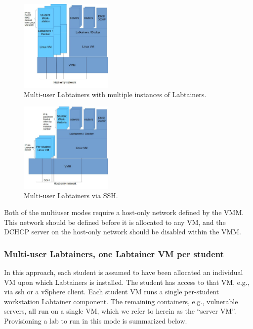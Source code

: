 \documentclass[12pt]{article}
\begin{document}
\begin{figure}[ht]
\centering
\includegraphics[width=0.4\textwidth,natwidth=621,natheight=403]{multiuser-multilabtainers.jpg}
\caption{Multi-user Labtainers with multiple instances of Labtainers.}
\label{fig:multi-multi}
\end{figure}

\begin{figure}[ht]
\centering
\includegraphics[width=0.4\textwidth,natwidth=621,natheight=403]{multiuser-onelabtainer.jpg}
\caption{Multi-user Labtainers via SSH.}
\label{fig:multi-single}
\end{figure}

Both of the multiuser modes require a host-only network defined by the VMM.  This network should be defined
before it is allocated to any VM, and the DCHCP server on the host-only network should be disabled within 
the VMM.  

\subsubsection {Multi-user Labtainers, one Labtainer VM per student}
In this approach, each student is assumed to have been allocated an
individual VM upon which Labtainers is installed.
The student has access to that VM, e.g., via ssh or a vSphere client.  
Each student VM runs a single per-student workstation Labtainer component.
The remaining containers, e.g., vulnerable servers, all run on a single VM,
which we refer to herein as the ``server VM''.  Provisioning a lab to run
in this mode is summarized below.
\end{document}
